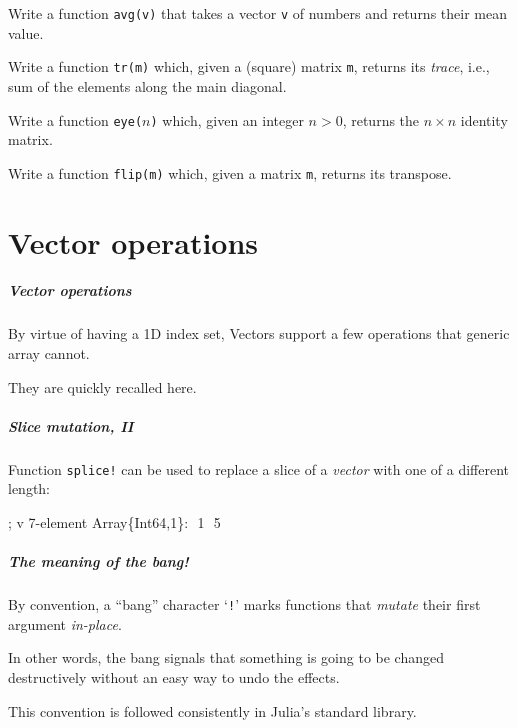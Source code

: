 \documentclass[english,serif,mathserif,xcolor=pdftex,dvipsnames,table]{beamer}
\begin{document}
\begin{frame}[fragile]
  \begin{exercise*}[3.A]
    Write a function \texttt{avg(v)} that takes a vector \texttt{v} of
    numbers and returns their mean value.
  \end{exercise*}

  \+
  \begin{exercise*}[3.B]
    Write a function \texttt{tr(m)} which, given a (square) matrix
    \texttt{m}, returns its \emph{trace}, i.e., sum of the elements
    along the main diagonal.
  \end{exercise*}

  \+
  \begin{exercise*}[3.C]
    Write a function \texttt{eye($n$)} which, given an integer
    $n>0$, returns the $n\times n$ identity matrix.
  \end{exercise*}

  \+
  \begin{exercise*}[3.D]
    Write a function \texttt{flip(m)} which, given a matrix
    \texttt{m}, returns its transpose.
  \end{exercise*}
\end{frame}


\part{Vector operations}
\begin{frame}
  \frametitle{Vector operations}
  By virtue of having a 1D index set, Vectors support a few operations
  that generic array cannot.

  \+
  They are quickly recalled here.
\end{frame}


\begin{frame}[fragile]
  \frametitle{Slice mutation, II}

  Function \texttt{splice!} can be used to replace a slice of a \emph{vector}
  with one of a different length:
\begin{semiverbatim}
\julia {};
\julia v
7-element Array\{Int64,1\}:
 \,\,1
 \,\,5
\end{semiverbatim}
\end{frame}


\begin{frame}
  \frametitle{The meaning of the bang!}

  By convention, a ``bang'' character `\texttt{!}' marks functions that \emph{mutate}
  their first argument \emph{in-place}.

  \+ In other words, the bang signals that something is going to be
  changed destructively without an easy way to undo the effects.

  \+
  This convention is followed consistently in Julia's standard library.
\end{frame}
\end{document}
